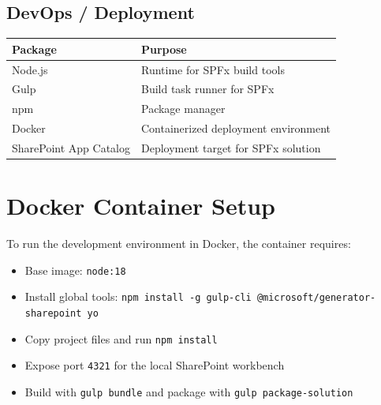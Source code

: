 \documentclass[12pt]{article}
\begin{document}
\subsection{DevOps / Deployment}
\begin{longtable}{|p{2.5in}|p{3.5in}|}
\hline
\textbf{Package} & \textbf{Purpose} \\ \hline
Node.js & Runtime for SPFx build tools \\ \hline
Gulp & Build task runner for SPFx \\ \hline
npm & Package manager \\ \hline
Docker & Containerized deployment environment \\ \hline
SharePoint App Catalog & Deployment target for SPFx solution \\ \hline
\end{longtable}

\section{Docker Container Setup}
To run the development environment in Docker, the container requires:
\begin{itemize}
    \item Base image: \texttt{node:18}
    \item Install global tools: \texttt{npm install -g gulp-cli @microsoft/generator-sharepoint yo}
    \item Copy project files and run \texttt{npm install}
    \item Expose port \texttt{4321} for the local SharePoint workbench
    \item Build with \texttt{gulp bundle} and package with \texttt{gulp package-solution}
\end{itemize}
\end{document}
